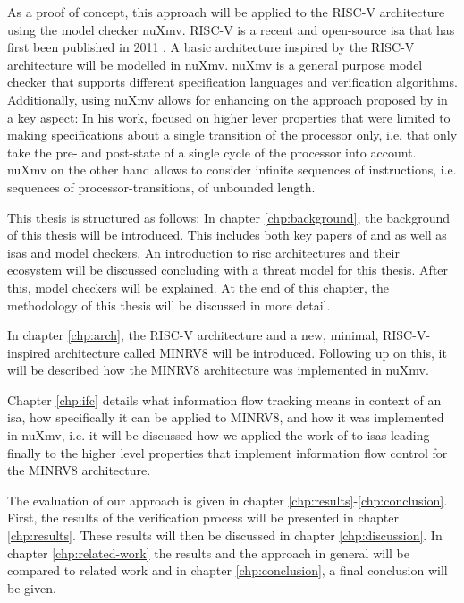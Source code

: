 As a proof of concept, this approach will be applied to the RISC-V architecture using the model checker nuXmv.
RISC-V is a recent and open-source \gls{isa} that has first been published in 2011 \cite{RiscVISA-org}.
A basic architecture inspired by the RISC-V architecture will be modelled in nuXmv.
nuXmv is a general purpose model checker that supports different specification languages and verification algorithms.
Additionally, using nuXmv allows for enhancing on the approach proposed by \citeauthor{Reid17} in a key aspect:
In his work, \citeauthor{Reid17} focused on higher lever properties that were limited to making specifications about a single transition of the processor only, i.e. that only take the pre- and post-state of a single cycle of the processor into account.
nuXmv on the other hand allows to consider infinite sequences of instructions, i.e. sequences of processor-transitions, of unbounded length.

This thesis is structured as follows:
In chapter \ref{chp:background}, the background of this thesis will be introduced.
This includes both key papers of \citeauthor{Reid17} and \citeauthor{Ferraiuolo17} as well as \glspl{isa} and model checkers.
An introduction to \gls{risc} architectures and their ecosystem will be discussed concluding with a threat model for this thesis.
After this, model checkers will be explained.
At the end of this chapter, the methodology of this thesis will be discussed in more detail.

In chapter \ref{chp:arch}, the RISC-V architecture and a new, minimal, RISC-V-inspired architecture called MINRV8 will be introduced.
Following up on this, it will be described how the MINRV8 architecture was implemented in nuXmv.

Chapter \ref{chp:ifc} details what information flow tracking means in context of an \gls{isa}, how specifically it can be applied to MINRV8, and how it was implemented in nuXmv, i.e. it will be discussed how we applied the work of \citeauthor{Ferraiuolo17} \cite{Ferraiuolo17} to \glspl{isa} leading finally to the higher level properties that implement information flow control for the MINRV8 architecture.

The evaluation of our approach is given in chapter \ref{chp:results}-\ref{chp:conclusion}.
First, the results of the verification process will be presented in chapter \ref{chp:results}.
These results will then be discussed in chapter \ref{chp:discussion}.
In chapter \ref{chp:related-work} the results and the approach in general will be compared to related work and in chapter \ref{chp:conclusion}, a final conclusion will be given.

